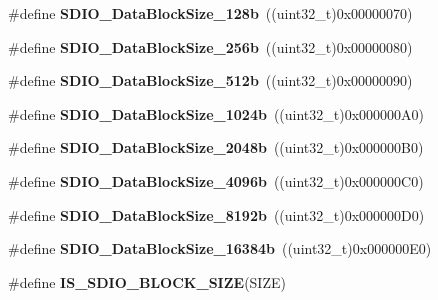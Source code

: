 \begin{DoxyCompactItemize}
\item 
\hypertarget{group__SDIO__Data__Block__Size_gaba545c3a5e0f3296341d89a647cb9751}{
\#define {\bfseries SDIO\_\-DataBlockSize\_\-128b}~((uint32\_\-t)0x00000070)}
\label{group__SDIO__Data__Block__Size_gaba545c3a5e0f3296341d89a647cb9751}

\item 
\hypertarget{group__SDIO__Data__Block__Size_gaa099d7706f98a4fa6eb88277dc6680cf}{
\#define {\bfseries SDIO\_\-DataBlockSize\_\-256b}~((uint32\_\-t)0x00000080)}
\label{group__SDIO__Data__Block__Size_gaa099d7706f98a4fa6eb88277dc6680cf}

\item 
\hypertarget{group__SDIO__Data__Block__Size_gaa619848f7700962c5b7065f43e286e0b}{
\#define {\bfseries SDIO\_\-DataBlockSize\_\-512b}~((uint32\_\-t)0x00000090)}
\label{group__SDIO__Data__Block__Size_gaa619848f7700962c5b7065f43e286e0b}

\item 
\hypertarget{group__SDIO__Data__Block__Size_ga7dad3c1c33e63a00eb6301b0a1135baf}{
\#define {\bfseries SDIO\_\-DataBlockSize\_\-1024b}~((uint32\_\-t)0x000000A0)}
\label{group__SDIO__Data__Block__Size_ga7dad3c1c33e63a00eb6301b0a1135baf}

\item 
\hypertarget{group__SDIO__Data__Block__Size_ga41eb937621c7ffcf2688c6bc0ea31464}{
\#define {\bfseries SDIO\_\-DataBlockSize\_\-2048b}~((uint32\_\-t)0x000000B0)}
\label{group__SDIO__Data__Block__Size_ga41eb937621c7ffcf2688c6bc0ea31464}

\item 
\hypertarget{group__SDIO__Data__Block__Size_ga360411488abdbaf9eee9b99fca793f79}{
\#define {\bfseries SDIO\_\-DataBlockSize\_\-4096b}~((uint32\_\-t)0x000000C0)}
\label{group__SDIO__Data__Block__Size_ga360411488abdbaf9eee9b99fca793f79}

\item 
\hypertarget{group__SDIO__Data__Block__Size_gaf61913f3eff52c0f728db9ffbdaca7d2}{
\#define {\bfseries SDIO\_\-DataBlockSize\_\-8192b}~((uint32\_\-t)0x000000D0)}
\label{group__SDIO__Data__Block__Size_gaf61913f3eff52c0f728db9ffbdaca7d2}

\item 
\hypertarget{group__SDIO__Data__Block__Size_gae80bc49dbed677f7087d523c31fe10ae}{
\#define {\bfseries SDIO\_\-DataBlockSize\_\-16384b}~((uint32\_\-t)0x000000E0)}
\label{group__SDIO__Data__Block__Size_gae80bc49dbed677f7087d523c31fe10ae}

\item 
\#define {\bfseries IS\_\-SDIO\_\-BLOCK\_\-SIZE}(SIZE)
\end{DoxyCompactItemize}


